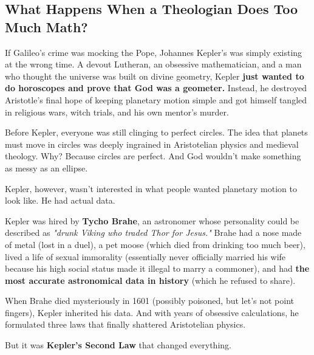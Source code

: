\subsection{What Happens When a Theologian Does Too Much Math?}

If Galileo’s crime was mocking the Pope, Johannes Kepler’s was simply existing at the wrong time. A devout Lutheran, an obsessive mathematician, and a man who thought the universe was built on divine geometry, Kepler \textbf{just wanted to do horoscopes and prove that God was a geometer.} Instead, he destroyed Aristotle’s final hope of keeping planetary motion simple and got himself tangled in religious wars, witch trials, and his own mentor’s murder.

Before Kepler, everyone was still clinging to perfect circles. The idea that planets must move in circles was deeply ingrained in Aristotelian physics and medieval theology. Why? Because circles are perfect. And God wouldn’t make something as messy as an ellipse.

Kepler, however, wasn’t interested in what people wanted planetary motion to look like. He had actual data.

Kepler was hired by \textbf{Tycho Brahe}, an astronomer whose personality could be described as \textit{"drunk Viking who traded Thor for Jesus."} Brahe had a nose made of metal (lost in a duel), a pet moose (which died from drinking too much beer), lived a life of sexual immorality (essentially never officially married his wife because his high social status made it illegal to marry a commoner),  and had \textbf{the most accurate astronomical data in history} (which he refused to share).

When Brahe died mysteriously in 1601 (possibly poisoned, but let’s not point fingers), Kepler inherited his data. And with years of obsessive calculations, he formulated three laws that finally shattered Aristotelian physics.

But it was \textbf{Kepler’s Second Law} that changed everything.

